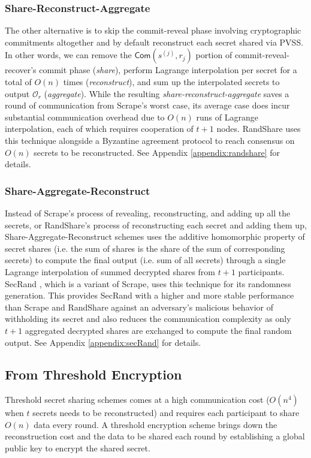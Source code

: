 \documentclass[letterpaper,twocolumn,10pt]{article}
\theoremstyle{definition}
\theoremstyle{remark}
\begin{document}
\subsubsection{Share-Reconstruct-Aggregate}
The other alternative is to skip the commit-reveal phase involving cryptographic commitments altogether and by default reconstruct each secret shared via PVSS. In other words, we can remove the $\mathsf{Com}(s^{(j)}, r_j)$ portion of commit-reveal-recover's commit phase (\textit{share}), perform Lagrange interpolation per secret for a total of $O(n)$ times (\textit{reconstruct}), and sum up the interpolated secrets to output $\mathcal{O}_r$ (\textit{aggregate}). While the resulting \textit{share-reconstruct-aggregate} saves a round of communication from Scrape's worst case, its average case does incur substantial communication overhead due to $O(n)$ runs of Lagrange interpolation, each of which requires cooperation of $t + 1$ nodes. RandShare \cite{syta2017scalable} uses this technique alongside a Byzantine agreement protocol to reach consensus on $O(n)$ secrets to be reconstructed. See Appendix \ref{appendix:randshare} for details.

\subsubsection{Share-Aggregate-Reconstruct}
Instead of Scrape's process of revealing, reconstructing, and adding up all the secrets, or RandShare's process of reconstructing each secret and adding them up, Share-Aggregate-Reconstruct schemes uses the additive homomorphic property of secret shares (i.e. the sum of shares is the share of the sum of corresponding secrets) to compute the final output (i.e. sum of all secrets) through a single Lagrange interpolation of summed decrypted shares from $t + 1$ participants. SecRand \cite{guo2020secRand}, which is a variant of Scrape, uses this technique for its randomness generation. This provides SecRand with a higher and more stable performance than Scrape and RandShare against an adversary's malicious behavior of withholding its secret and also reduces the communication complexity as only $t + 1$ aggregated decrypted shares are exchanged to compute the final random output. See Appendix \ref{appendix:secRand} for details.

\subsection{From Threshold Encryption}
Threshold secret sharing schemes comes at a high communication cost ($O(n^4)$ when $t$ secrets needs to be reconstructed) and requires each participant to share $O(n)$ data every round. A threshold encryption scheme brings down the reconstruction cost and the data to be shared each round by establishing a global public key to encrypt the shared secret.
\end{document}
